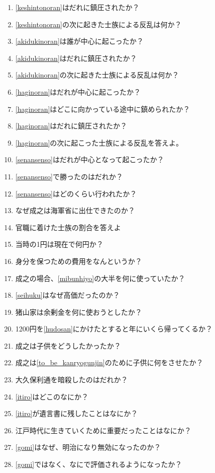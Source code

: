 \documentclass[]{jsarticle}
\begin{document}
\begin{enumerate}
	\item \ref{keshintonoran}はだれに鎮圧されたか？
	\item \ref{keshintonoran}の次に起きた士族による反乱は何か？\label{akidukinoran}
	\item \ref{akidukinoran}は誰が中心に起こったか？
	\item \ref{akidukinoran}はだれに鎮圧されたか？
	\item \ref{akidukinoran}の次に起きた士族による反乱は何か？\label{haginoran}
	\item \ref{haginoran}はだれが中心に起こったか？
	\item \ref{haginoran}はどこに向かっている途中に鎮められたか？
	\item \ref{haginoran}はだれに鎮圧されたか？
	\item \ref{haginoran}の次に起こった士族による反乱を答えよ。\label{senansenso}
	\item \ref{senansenso}はだれが中心となって起こったか？
	\item \ref{senansenso}で勝ったのはだれか？
	\item \ref{senansenso}はどのくらい行われたか？
	\item なぜ成之は海軍省に出仕できたのか？
	\item 官職に着けた士族の割合を答えよ
	\item 当時の1円は現在で何円か？
	\item 身分を保つための費用をなんというか？\label{mibunhiyo}
	\item 成之の場合、\ref{mibunhiyo}の大半を何に使っていたか？\label{seihuku}
	\item \ref{seihuku}はなぜ高価だったのか？
	\item 猪山家は余剰金を何に使おうとしたか？\label{hudosan}
	\item 1200円を\ref{hudosan}にかけたとすると年にいくら帰ってくるか？
	\item 成之は子供をどうしたかったか？\label{to_be_kanryogunjin}
	\item 成之は\ref{to_be_kanryogunjin}のために子供に何をさせたか？
	\item 大久保利通を暗殺したのはだれか？\label{itiro}
	\item \ref{itiro}はどこのなにか？
	\item \ref{itiro}が遺言書に残したことはなにか？
	\item 江戸時代に生きていくために重要だったことはなにか？\label{gomi}
	\item \ref{gomi}はなぜ、明治になり無効になったのか？
	\item \ref{gomi}ではなく、なにで評価されるようになったか？

\end{enumerate}
\end{document}
